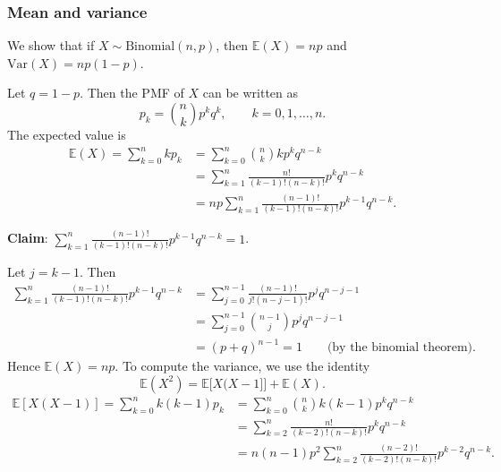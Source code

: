 \documentclass[lecture]{csm}
\newcommand{\expe}{\mathbb{E}}
\newcommand{\var}{\text{Var}}
\begin{document}
\subsubsection*{Mean and variance}
We show that if $X\sim\text{Binomial}(n,p)$, then $\expe(X)=np$ and $\var(X)=np(1-p)$.

\vspace*{2ex}
Let $q=1-p$. Then the PMF of $X$ can be written as 
\[
p_k = \binom{n}{k} p^k q^k,\qquad k=0,1,\ldots,n.
\]
The expected value is
\begin{align*}
\expe(X)
	= \sum_{k=0}^{n} kp_k
	& = \sum_{k=0}^{n}\binom{n}{k} k p^{k}q^{n-k} \\
	& = \sum_{k=1}^{n}\frac{n!}{(k-1)!(n-k)!} p^{k} q^{n-k} \\
	& = np\sum_{k=1}^{n}\frac{(n-1)!}{(k-1)!(n-k)!} p^{k-1} q^{n-k}.
\end{align*}

\textbf{Claim}: $\displaystyle\sum_{k=1}^{n}\frac{(n-1)!}{(k-1)!(n-k)!} p^{k-1} q^{n-k} = 1$.

Let $j=k-1$. Then
\begin{align*}
\sum_{k=1}^{n}\frac{(n-1)!}{(k-1)!(n-k)!} p^{k-1} q^{n-k}
	& = \sum_{j=0}^{n-1}\frac{(n-1)!}{j!(n-j-1)!} p^{j} q^{n-j-1} \\
	& = \sum_{j=0}^{n-1}\binom{n-1}{j} p^{j} q^{n-j-1} \\
	& = (p+q)^{n-1} = 1 \qquad\text{(by the binomial theorem).}
\end{align*}
Hence $\expe(X)=np$.
To compute the variance, we use the identity 
\[
\expe(X^2) = \expe\big[X(X-1]\big]+\expe(X).
\]
\begin{align*}
\expe[X(X - 1)]
	= \sum_{k=0}^{n} k(k-1)p_k 
	& = \sum_{k=0}^{n} \binom{n}{k} k(k-1)p^{k} q^{n-k} \\
	& = \sum_{k=2}^{n}\frac{n!}{(k-2)!(n-k)!} p^{k} q^{n-k}  \\
	& = n(n-1)p^{2} \sum_{k=2}^{n}\frac{(n-2)!}{(k-2)!(n-k)!} p^{k-2} q^{n-k}.
\end{align*}
\end{document}

